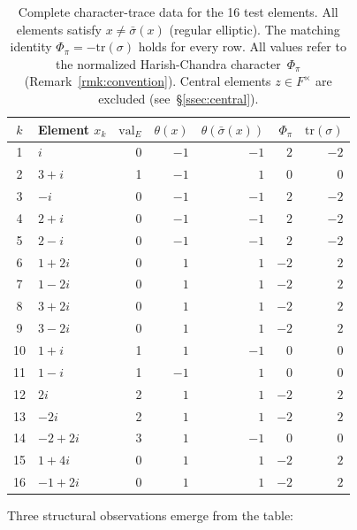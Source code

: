 \documentclass[11pt]{article}
\theoremstyle{plain}
\theoremstyle{definition}
\theoremstyle{remark}
\newcommand{\tr}{\mathrm{tr}}
\newcommand{\val}{\mathrm{val}}
\newcommand{\Phipi}{\Phi_\pi}
\begin{document}
\begin{table}[ht]
\centering
\caption{Complete character-trace data for the 16 test elements.
  All elements satisfy $x \neq \bar\sigma(x)$ (regular elliptic).
  The matching identity $\Phipi = -\tr(\sigma)$ holds for
  every row.  All values refer to the normalized Harish-Chandra
  character~$\Phipi$ (Remark~\ref{rmk:convention}).
  Central elements $z \in F^\times$ are excluded
  (see~\S\ref{ssec:central}).}
\label{tab:full16}
\begin{tabular}{clrrrrr}
\toprule
$k$ & \textbf{Element} $x_k$ & $\val_E$ & $\theta(x)$ & $\theta(\bar\sigma(x))$ & $\Phipi$ & $\tr(\sigma)$ \\
\midrule
1  & $i$         & 0 & $-1$ & $-1$ & $2$  & $-2$ \\
2  & $3+i$       & 1 & $-1$ & $1$  & $0$  & $0$  \\
3  & $-i$        & 0 & $-1$ & $-1$ & $2$  & $-2$ \\
4  & $2+i$       & 0 & $-1$ & $-1$ & $2$  & $-2$ \\
5  & $2-i$       & 0 & $-1$ & $-1$ & $2$  & $-2$ \\
6  & $1+2i$      & 0 & $1$  & $1$  & $-2$ & $2$  \\
7  & $1-2i$      & 0 & $1$  & $1$  & $-2$ & $2$  \\
8  & $3+2i$      & 0 & $1$  & $1$  & $-2$ & $2$  \\
9  & $3-2i$      & 0 & $1$  & $1$  & $-2$ & $2$  \\
10 & $1+i$       & 1 & $1$  & $-1$ & $0$  & $0$  \\
11 & $1-i$       & 1 & $-1$ & $1$  & $0$  & $0$  \\
12 & $2i$        & 2 & $1$  & $1$  & $-2$ & $2$  \\
13 & $-2i$       & 2 & $1$  & $1$  & $-2$ & $2$  \\
14 & $-2+2i$     & 3 & $1$  & $-1$ & $0$  & $0$  \\
15 & $1+4i$      & 0 & $1$  & $1$  & $-2$ & $2$  \\
16 & $-1+2i$     & 0 & $1$  & $1$  & $-2$ & $2$  \\
\bottomrule
\end{tabular}
\end{table}

Three structural observations emerge from the table:
\end{document}
